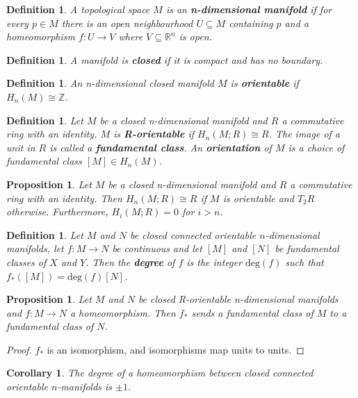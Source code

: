 \documentclass{article}
\newtheorem{definition}[theorem]{Definition}
\newtheorem{proposition}[theorem]{Proposition}
\newtheorem{corollary}[theorem]{Corollary}
\begin{document}
\begin{definition}
A topological space $M$ is an \textbf{n-dimensional manifold} if for every $p\in M$ there is an open neighbourhood $U\subseteq M$ containing $p$ and a homeomorphism $f\colon U\to V$ where $V\subseteq\mathbb{R}^n$ is open.
\end{definition}

\begin{definition}
A manifold is \textbf{closed} if it is compact and has no boundary.
\end{definition}

\begin{definition}
An n-dimensional closed manifold $M$ is \textbf{orientable} if $H_n(M)\cong \mathbb{Z}$.
\end{definition}

\begin{definition}
Let $M$ be a closed n-dimensional manifold and $R$ a commutative ring with an identity. $M$ is \textbf{R-orientable} if $H_n(M;R)\cong R$. The image of a unit in $R$ is called a \textbf{fundamental class}. An \textbf{orientation} of $M$ is a choice of fundamental class $[M]\in H_n(M)$.
\end{definition}

\begin{proposition}
Let $M$ be a closed n-dimensional manifold and $R$ a commutative ring with an identity. Then $H_n(M;R)\cong R$ if $M$ is orientable and $T_2R$ otherwise. Furthermore, $H_i(M;R)=0$ for $i>n$.
\end{proposition}

\begin{definition}
Let $M$ and $N$ be closed connected orientable $n$-dimensional manifolds, let $f\colon M\to N$ be continuous and let $[M]$ and $[N]$ be fundamental classes of $X$ and $Y$. Then the \textbf{degree} of $f$ is the integer $\text{deg}(f)$ such that $f_*([M])=\text{deg}(f)[N]$.
\end{definition}

\begin{proposition}
Let $M$ and $N$ be closed R-orientable n-dimensional manifolds and $f\colon M\to N$ a homeomorphism. Then $f_*$ sends a fundamental class of $M$ to a fundamental class of $N$.
\end{proposition}
\begin{proof}
$f_*$ is an isomorphism, and isomorphisms map units to units.
\end{proof}

\begin{corollary}
The degree of a homeomorphism between closed connected orientable $n$-manifolds is $\pm 1$.
\end{corollary}
\end{document}
